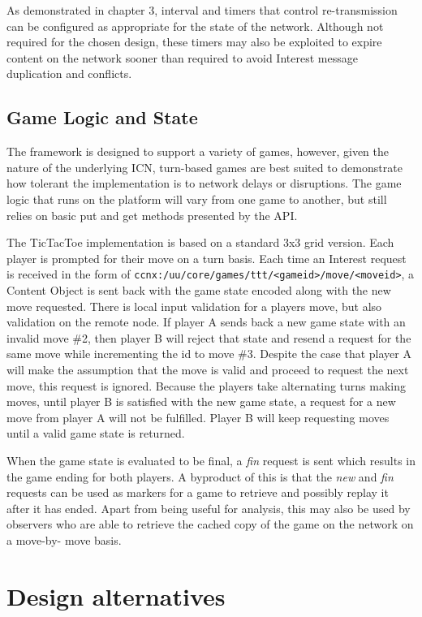 \documentclass[a4paper,12pt]{report}      %
\begin{document}
As demonstrated in chapter 3, interval and timers that control re-transmission can be configured as
appropriate for the state of the network. Although not required for the chosen design, these timers may
also be exploited to expire content on the network sooner than required to avoid Interest message
duplication and conflicts.

\subsection{Game Logic and State}

The framework is designed to support a variety of games, however, given the nature of the underlying
ICN, turn-based games are best suited to demonstrate how tolerant the implementation is
to network delays or disruptions. The game logic that runs on the platform will vary from one game to
another, but still relies on basic put and get methods presented by the API.

The TicTacToe implementation is based on a standard 3x3 grid version. Each player is prompted for
their move on a turn basis. Each time an Interest request is received in the form of
\verb!ccnx:/uu/core/games/ttt/<gameid>/move/<moveid>!, a Content Object is sent back with the game state
encoded along with the new move requested. There is local input validation for a players move, but
also validation on the remote node. If player A sends back a new game state with an invalid move \#2,
then player B will reject that state and resend a request for the same move while incrementing the id to move \#3. 
Despite the case that player A will make the assumption that the move is valid and proceed to request the next move, 
this request is ignored. Because the players take alternating turns making moves, until player B is satisfied with the new game state, a
request for a new move from player A will not be fulfilled. Player B will keep requesting moves until a
valid game state is returned.

When the game state is evaluated to be final, a \emph{fin} request is sent which results in the game ending for
both players. A byproduct of this is that the \emph{new} and \emph{fin} requests can be used as markers for a game to
retrieve and possibly replay it after it has ended. Apart from being useful for analysis, this may also be
used by observers who are able to retrieve the cached copy of the game on the network on a move-by-
move basis.

\section{Design alternatives}
\end{document}

